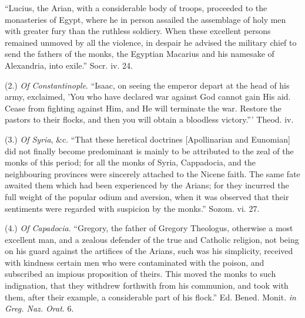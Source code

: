 ``Lucius, the Arian, with a considerable body of troops,
proceeded to the monasteries of Egypt, where he in person assailed the
assemblage of holy men with greater fury than the ruthless soldiery.
When these excellent persons remained unmoved by all the violence, in
despair he advised the military chief to send the fathers of the
monks, the Egyptian Macarius and his namesake of Alexandria, into
exile.'' Socr. iv. 24.

(2.) \emph{Of Constantinople}. ``Isaac, on seeing the emperor
depart at the head of his army, exclaimed, 'You who have declared war
against God cannot gain His aid. Cease from fighting against Him, and
He will terminate the war. Restore the pastors to their flocks, and
then you will obtain a bloodless victory.''' Theod. iv.

(3.) \emph{Of Syria}, \&c. ``That these heretical doctrines
[Apollinarian and Eunomian] did not finally become predominant is
mainly to be attributed to the zeal of the monks of this period; for
all the monks of Syria, Cappadocia, and the neighbouring provinces
were sincerely attached to the Nicene faith. The same fate awaited
them which had been experienced by the Arians; for they incurred the
full weight of the popular odium and aversion, when it was
observed that their sentiments were regarded with suspicion by the
monks.'' Sozom. vi. 27.

(4.) \emph{Of Capadocia}. ``Gregory, the father of Gregory
Theologus, otherwise a most excellent man, and a zealous defender of
the true and Catholic religion, not being on his guard against the
artifices of the Arians, such was his simplicity, received with
kindness certain men who were contaminated with the poison, and
subscribed an impious proposition of theirs. This moved the monks to
such indignation, that they withdrew forthwith from his communion, and
took with them, after their example, a considerable part of his
flock.'' Ed. Bened. Monit. \emph{in Greg. Naz. Orat}. 6.

